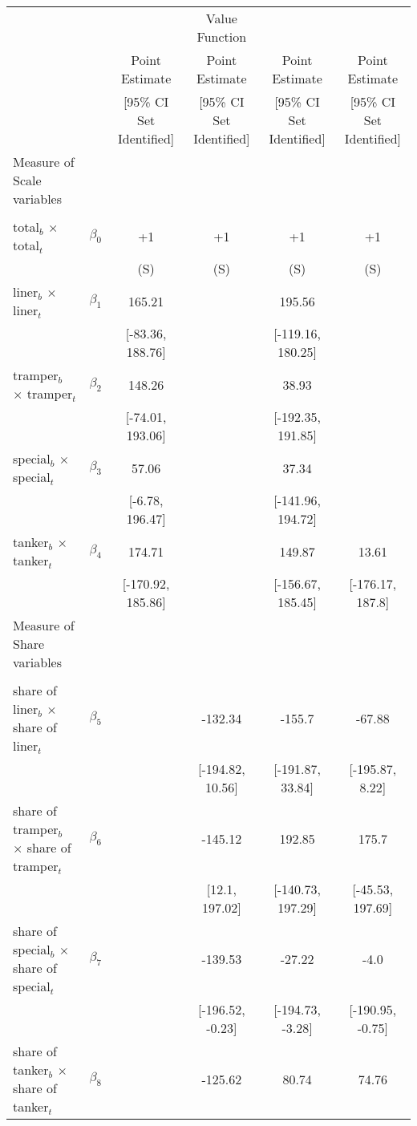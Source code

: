 \begin{tabular}{@{\extracolsep{5pt}}lccccc}
\toprule 
 &  &  & Value Function &  &  \\
 &  & Point Estimate & Point Estimate & Point Estimate & Point Estimate \\
 &  & [95\% CI Set Identified] & [95\% CI Set Identified] & [95\% CI Set Identified] & [95\% CI Set Identified] \\
\midrule 
Measure of Scale variables &  &  &  &  &  \\
 &  &  &  &  \\
total$_{b}$ $\times$ total$_{t}$ & $\beta_0$ & +1 & +1 & +1 & +1 \\
 &  & (S) & (S) & (S) & (S) \\
liner$_{b}$ $\times$ liner$_{t}$ & $\beta_1$ & 165.21 &  & 195.56 &  \\
 &  & [-83.36, 188.76] &  & [-119.16, 180.25] &  \\
tramper$_{b}$ $\times$ tramper$_{t}$ & $\beta_2$ & 148.26 &  & 38.93 &  \\
 &  & [-74.01, 193.06] &  & [-192.35, 191.85] &  \\
special$_{b}$ $\times$ special$_{t}$ & $\beta_3$ & 57.06 &  & 37.34 &  \\
 &  & [-6.78, 196.47] &  & [-141.96, 194.72] &  \\
tanker$_{b}$ $\times$ tanker$_{t}$ & $\beta_4$ & 174.71 &  & 149.87 & 13.61 \\
 &  & [-170.92, 185.86] &  & [-156.67, 185.45] & [-176.17, 187.8] \\
Measure of Share variables &  &  &  &  &  \\
 &  &  &  &  &  \\
share of liner$_{b}$ $\times$ share of liner$_{t}$ & $\beta_5$ &  & -132.34 & -155.7 & -67.88 \\
 &  &  & [-194.82, 10.56] & [-191.87, 33.84] & [-195.87, 8.22] \\
share of tramper$_{b}$ $\times$ share of tramper$_{t}$ & $\beta_6$ &  & -145.12 & 192.85 & 175.7 \\
 &  &  & [12.1, 197.02] & [-140.73, 197.29] & [-45.53, 197.69] \\
share of special$_{b}$ $\times$ share of special$_{t}$ & $\beta_7$ &  & -139.53 & -27.22 & -4.0 \\
 &  &  & [-196.52, -0.23] & [-194.73, -3.28] & [-190.95, -0.75] \\
share of tanker$_{b}$ $\times$ share of tanker$_{t}$ & $\beta_8$ &  & -125.62 & 80.74 & 74.76 \\

\end{tabular}
